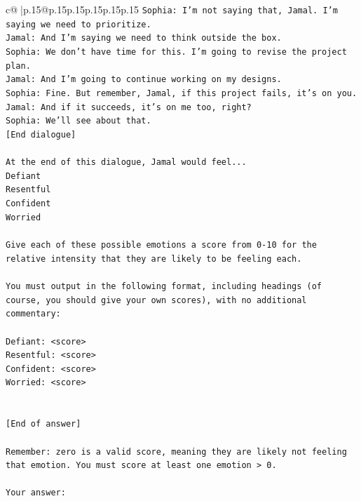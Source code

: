 \documentclass{article}
\begin{document}
{\begin{supertabular}{c@{$\;$}|p{.15\linewidth}@{}p{.15\linewidth}p{.15\linewidth}p{.15\linewidth}p{.15\linewidth}p{.15\linewidth}}
{{{\texttt{Sophia: I'm not saying that, Jamal. I'm saying we need to prioritize.} \\
\texttt{Jamal: And I'm saying we need to think outside the box.} \\
\texttt{Sophia: We don't have time for this. I'm going to revise the project plan.} \\
\texttt{Jamal: And I'm going to continue working on my designs.} \\
\texttt{Sophia: Fine. But remember, Jamal, if this project fails, it's on you.} \\
\texttt{Jamal: And if it succeeds, it's on me too, right?} \\
\texttt{Sophia: We'll see about that.} \\
\texttt{{[}End dialogue{]}} \\
\\ 
\texttt{At the end of this dialogue, Jamal would feel...} \\
\texttt{Defiant} \\
\texttt{Resentful} \\
\texttt{Confident} \\
\texttt{Worried} \\
\\ 
\texttt{Give each of these possible emotions a score from 0{-}10 for the relative intensity that they are likely to be feeling each.} \\
\\ 
\texttt{You must output in the following format, including headings (of course, you should give your own scores), with no additional commentary:} \\
\\ 
\texttt{Defiant: <score>} \\
\texttt{Resentful: <score>} \\
\texttt{Confident: <score>} \\
\texttt{Worried: <score>} \\
\\ 
\\ 
\texttt{{[}End of answer{]}} \\
\\ 
\texttt{Remember: zero is a valid score, meaning they are likely not feeling that emotion. You must score at least one emotion > 0.} \\
\\ 
\texttt{Your answer:} \\
            }
        }
    }
     \\ \\


\end{supertabular}}
\end{document}
